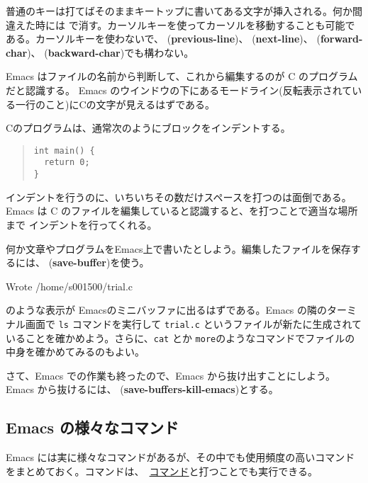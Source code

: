 普通のキーは打てばそのままキートップに書いてある文字が挿入される。何か間違えた時には \BS で消す。カーソルキーを使ってカーソルを移動することも可能である。カーソルキーを使わないで、 ({\bf previous-line})、 ({\bf next-line})、
 ({\bf forward-char})、 ({\bf backward-char})でも構わない。

Emacs はファイルの名前から判断して、これから編集するのが C のプログラムだと認識する。
Emacs のウインドウの下にあるモードライン(反転表示されている一行のこと)にCの文字が見えるはずである。

Cのプログラムは、通常次のようにブロックをインデントする。
\begin{quote}
\begin{verbatim}
int main() {
  return 0;
}
\end{verbatim}
\end{quote}
インデントを行うのに、いちいちその数だけスペースを打つのは面倒である。Emacs は C のファイルを編集していると認識すると、を打つことで適当な場所まで
インデントを行ってくれる。

何か文章やプログラムをEmacs上で書いたとしよう。編集したファイルを保存するには、  ({\bf save-buffer})を使う。
\begin{commandline2}
Wrote /home/s001500/trial.c
\end{commandline2} \noindent
のような表示が Emacsのミニバッファに出るはずである。Emacs の隣のターミナル画面で {\tt ls} コマンドを実行して {\tt trial.c} というファイルが新たに生成されていることを確かめよう。さらに、{\tt cat} とか {\tt more}のようなコマンドでファイルの中身を確かめてみるのもよい。

さて、Emacs での作業も終ったので、Emacs から抜け出すことにしよう。Emacs から抜けるには、  ({\bf save-buffers-kill-emacs})とする。

\subsection{Emacs の様々なコマンド}
Emacs には実に様々なコマンドがあるが、その中でも使用頻度の高いコマンドをまとめておく。コマンドは、\ \underline{コマンド}と打つことでも実行できる。

